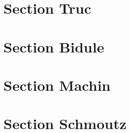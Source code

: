\section{Section Truc}



\section{Section Bidule}



\section{Section Machin}



\section{Section Schmoutz}


